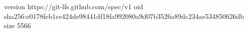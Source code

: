 version https://git-lfs.github.com/spec/v1
oid sha256:e0178feb1ce424de98441df18fa992080a9d07b3526a89dc234ae534850626db
size 5566
